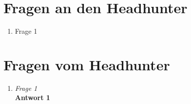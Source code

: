 \documentclass{scrartcl}
\begin{document}
    \section{Fragen an den Headhunter}\label{sec:fragen-an-den-headhunter}
    \begin{enumerate}
        \item Frage 1
    \end{enumerate}


    \section{Fragen vom Headhunter}\label{sec:fragen-vom-headhunter}
    \begin{enumerate}
        \item \textit{Frage 1}\\
        \textbf{Antwort 1}
    \end{enumerate}
\end{document}
